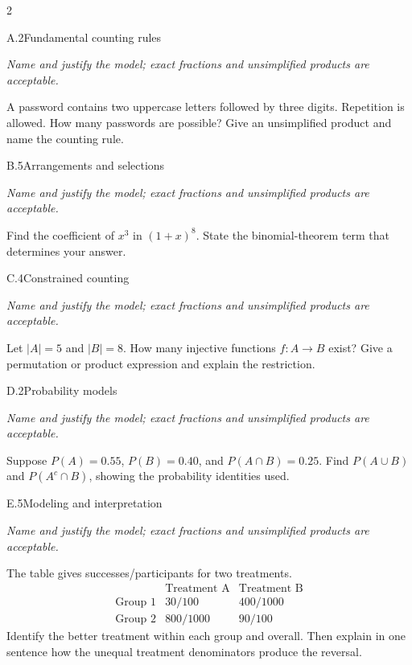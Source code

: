 \documentclass[9pt]{extarticle}
\begin{document}
\begin{multicols}{2}
\begin{CoreProblem}{A.2}{Fundamental counting rules}
{\scriptsize\textit{Name and justify the model; exact fractions and unsimplified products are acceptable.}\par}
A password contains two uppercase letters followed by three digits.
    Repetition is allowed. How many passwords are possible? Give an unsimplified
    product and name the counting rule.
\end{CoreProblem}
\begin{CoreProblem}{B.5}{Arrangements and selections}
{\scriptsize\textit{Name and justify the model; exact fractions and unsimplified products are acceptable.}\par}
Find the coefficient of $x^3$ in $(1+x)^8$. State the binomial-theorem
    term that determines your answer.
\end{CoreProblem}
\begin{CoreProblem}{C.4}{Constrained counting}
{\scriptsize\textit{Name and justify the model; exact fractions and unsimplified products are acceptable.}\par}
Let $|A|=5$ and $|B|=8$. How many injective functions $f:A\to B$
    exist? Give a permutation or product expression and explain the restriction.
\end{CoreProblem}
\columnbreak
\begin{CoreProblem}{D.2}{Probability models}
{\scriptsize\textit{Name and justify the model; exact fractions and unsimplified products are acceptable.}\par}
Suppose $P(A)=0.55$, $P(B)=0.40$, and $P(A\cap B)=0.25$. Find
    $P(A\cup B)$ and $P(A^c\cap B)$, showing the probability identities used.
\end{CoreProblem}
\begin{CoreProblem}{E.5}{Modeling and interpretation}
{\scriptsize\textit{Name and justify the model; exact fractions and unsimplified products are acceptable.}\par}
The table gives successes/participants for two treatments.
    \[
    \begin{array}{c|cc}
      &\text{Treatment A}&\text{Treatment B}\\\hline
      \text{Group 1}&30/100&400/1000\\
      \text{Group 2}&800/1000&90/100
    \end{array}
    \]
    Identify the better treatment within each group and overall. Then explain in
    one sentence how the unequal treatment denominators produce the reversal.
\end{CoreProblem}
\end{multicols}
\end{document}
